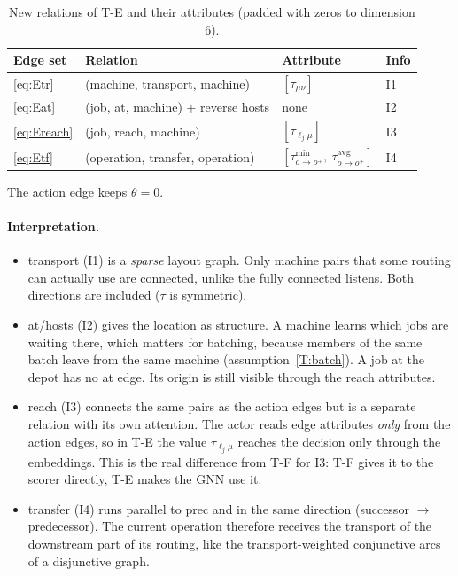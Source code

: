 \documentclass[11pt,a4paper]{article}
\newcommand{\loc}{\ell}
\begin{document}
\begin{table}[h]
\centering
\caption{New relations of T-E and their attributes (padded with zeros to dimension 6).}
\label{tab:TE}
\begin{tabular}{l l l l}
\toprule
Edge set & Relation & Attribute & Info \\
\midrule
\eqref{eq:Etr}   & (machine, \textsf{transport}, machine) & $[\tau_{\mu\nu}]$ & I1 \\
\eqref{eq:Eat}   & (job, \textsf{at}, machine) + reverse \textsf{hosts} & none & I2 \\
\eqref{eq:Ereach}& (job, \textsf{reach}, machine) & $[\tau_{\loc_j\mu}]$ & I3 \\
\eqref{eq:Etf}   & (operation, \textsf{transfer}, operation) & $[\tau^{\min}_{o\to o^+},\ \tau^{\mathrm{avg}}_{o\to o^+}]$ & I4 \\
\bottomrule
\end{tabular}
\end{table}
\noindent The action edge keeps $\theta=0$.

\paragraph{Interpretation.}
\begin{itemize}
  \item \textsf{transport} (I1) is a \emph{sparse} layout graph. Only machine
    pairs that some routing can actually use are connected, unlike the fully
    connected \textsf{listens}. Both directions are included ($\tau$ is symmetric).
  \item \textsf{at}/\textsf{hosts} (I2) gives the location as structure. A
    machine learns which jobs are waiting there, which matters for batching,
    because members of the same batch leave from the same machine
    (assumption~\ref{T:batch}). A job at the depot has no \textsf{at} edge. Its
    origin is still visible through the \textsf{reach} attributes.
  \item \textsf{reach} (I3) connects the same pairs as the action edges but is a
    separate relation with its own attention. The actor reads edge attributes
    \emph{only} from the action edges, so in T-E the value $\tau_{\loc_j\mu}$
    reaches the decision only through the embeddings. This is the real
    difference from T-F for I3: T-F gives it to the scorer directly, T-E makes
    the GNN use it.
  \item \textsf{transfer} (I4) runs parallel to \textsf{prec} and in the same
    direction (successor $\to$ predecessor). The current operation therefore
    receives the transport of the downstream part of its routing, like the
    transport-weighted conjunctive arcs of a disjunctive graph.
\end{itemize}
\end{document}
